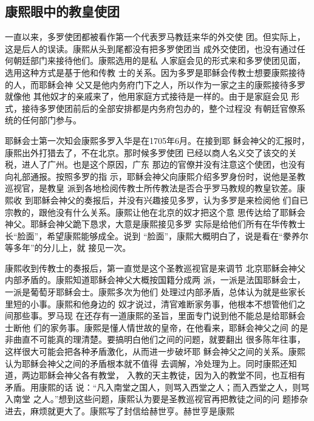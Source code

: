 \subsection{康熙眼中的教皇使团}
\par
一直以来，多罗使团都被看作第一个代表罗马教廷来华的外交使%
团。但实际上，这是后人的误读。康熙从头到尾都没有把多罗使团当%
成外交使团，也没有通过任何朝廷部门来接待他们。康熙选用的是私%
人家庭会见的形式来和多罗使团见面，选用这种方式是基于他和传教%
士的关系。因为多罗是耶稣会传教士想要康熙接待的人，而耶稣会神%
父又是他内务府门下之人，所以作为一家之主的康熙接待多罗就像他%
其他奴才的亲戚来了，他用家庭方式接待是一样的。由于是家庭会见%
形式，接待多罗使团前后的全部安排都是内务府包办的，整个过程没%
有朝廷官僚系统的任何部门参与。%
\par
耶稣会士第一次知会康熙多罗入华是在1705年6月。在接到耶%
稣会神父的汇报时，康熙出外打猎去了，不在北京。那时候多罗使团%
已经以商人名义交了该交的关税，进人了广州。也是这个原因，广东%
那边的官僚并没有注意这个使团，也没有向礼部通报。按照多罗的指%
示，耶稣会神父向康熙介绍多罗身份时，说他是圣教巡视官，是教皇%
派到各地检阅传教士所传教法是否合乎罗马教规的教皇钦差。康熙收%
到耶稣会神父的奏报后，并没有兴趣接见多罗，认为多罗是来检阅他%
们自已宗教的，跟他没有什么关系。康熙让他在北京的奴才把这个意%
思传达给了耶稣会神父。耶稣会神父跪下恳求，大意是康熙接见多罗%
实际是给他们所有在华传教士长“脸面”，希望康熙能够成全。说到%
“脸面”，康熙大概明白了，说是看在“豢养尔等多年”的分儿上，就%
接见一次。%
\par
康熙收到传教士的奏报后，第一直觉是这个圣教巡视官是来调节%
北京耶稣会神父内部矛盾的。康熙知道耶稣会神父大概按国籍分成两%
派，一派是法国耶稣会士，一派是葡萄牙耶稣会士。康熙多次为他们%
处理过内部矛盾，总体认为就是些家长里短的小事。康熙和他身边的%
奴才说过，清官难断家务事，他根本不想管他们之间那些事。罗马现%
在还存有一道康熙的圣旨，里面专门说到他不能总是给耶稣会士断他%
们的家务事。康熙是懂人情世故的皇帝，在他看来，耶稣会神父之间%
的是非曲直不可能真的理清楚。要搞明白他们之间的问题，就要翻出%
很多陈年往事，这样很大可能会把各种矛盾激化，从而进一步破坏耶%
稣会神父之间的关系。康熙认为耶稣会神父之间的矛盾根本就不值得%
去调解，冷处理为上。同时康熙还知道，两边耶稣会神父各有教堂，%
入教的天主教徒，因为入的教堂不同，也互相有矛盾。用康熙的话%
说：“凡入南堂之国人，则骂入西堂之人；而入西堂之人，则骂入南堂%
之人。”想到这些问题，康熙认为要是圣教巡视官再把教徒之间的问%
题掺杂进去，麻烦就更大了。康熙写了封信给赫世亨。赫世亨是康熙%
